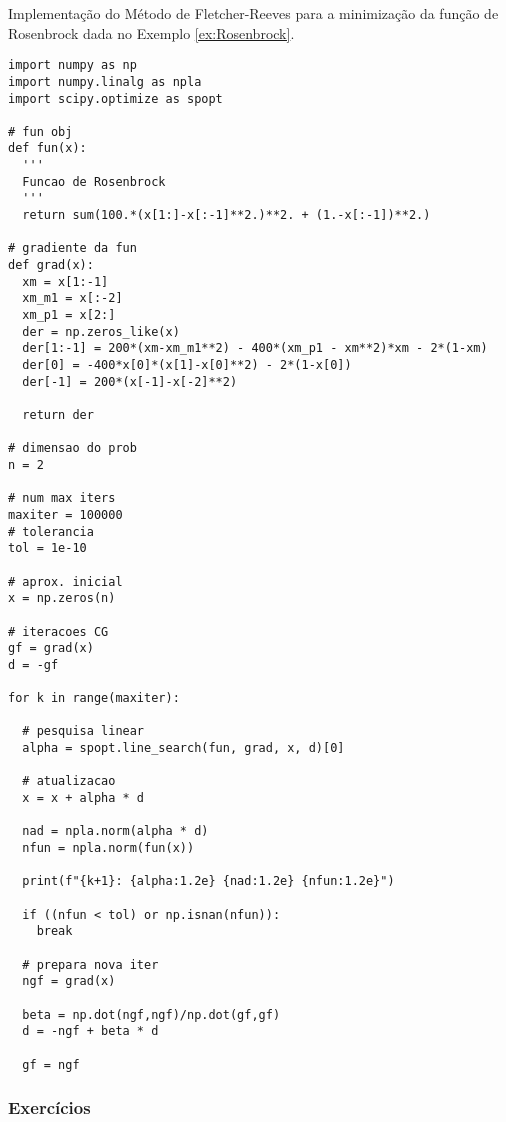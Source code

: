 \begin{ex}
  Implementação do Método de Fletcher-Reeves para a minimização da função de Rosenbrock dada no Exemplo \ref{ex:Rosenbrock}.
  

\begin{lstlisting}
import numpy as np
import numpy.linalg as npla
import scipy.optimize as spopt

# fun obj
def fun(x):
  '''
  Funcao de Rosenbrock
  '''
  return sum(100.*(x[1:]-x[:-1]**2.)**2. + (1.-x[:-1])**2.)

# gradiente da fun
def grad(x):
  xm = x[1:-1]
  xm_m1 = x[:-2]
  xm_p1 = x[2:]
  der = np.zeros_like(x)
  der[1:-1] = 200*(xm-xm_m1**2) - 400*(xm_p1 - xm**2)*xm - 2*(1-xm)
  der[0] = -400*x[0]*(x[1]-x[0]**2) - 2*(1-x[0])
  der[-1] = 200*(x[-1]-x[-2]**2)
  
  return der

# dimensao do prob
n = 2

# num max iters
maxiter = 100000
# tolerancia
tol = 1e-10

# aprox. inicial
x = np.zeros(n)

# iteracoes CG
gf = grad(x)
d = -gf

for k in range(maxiter):

  # pesquisa linear
  alpha = spopt.line_search(fun, grad, x, d)[0]

  # atualizacao
  x = x + alpha * d

  nad = npla.norm(alpha * d)
  nfun = npla.norm(fun(x))

  print(f"{k+1}: {alpha:1.2e} {nad:1.2e} {nfun:1.2e}")

  if ((nfun < tol) or np.isnan(nfun)):
    break

  # prepara nova iter
  ngf = grad(x)
  
  beta = np.dot(ngf,ngf)/np.dot(gf,gf)
  d = -ngf + beta * d

  gf = ngf  
\end{lstlisting}

\end{ex}

\subsubsection{Exercícios}
\badgeRevisar

